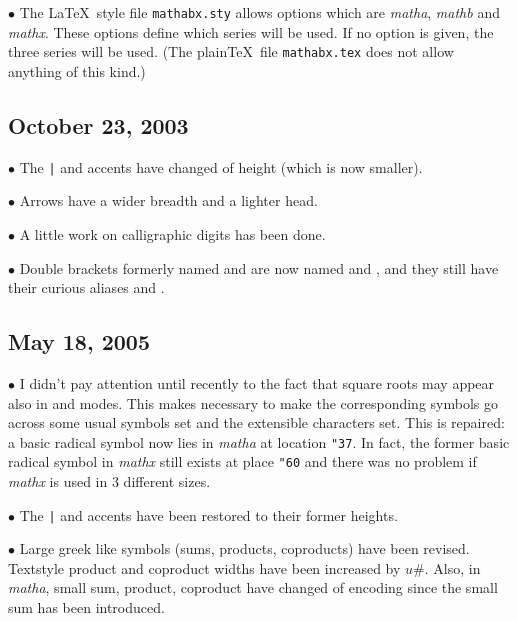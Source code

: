\item{$\bullet$}
The \LaTeX\ style file {\tt mathabx.sty} allows options
which are {\it matha}, {\it mathb}\/ and {\it mathx}.
These options define which series will be used.
If no option is given, the three series will be used.
(The plain\TeX\ file {\tt mathabx.tex} does not allow
anything of this kind.) 

\subsection*{October 23, 2003}

\item{$\bullet$} The {\tt\string\bar} and {\tt\string\widebar}
accents have changed of height (which is now smaller).

\item{$\bullet$} Arrows have a wider breadth and a lighter
head.

\item{$\bullet$} A little work on calligraphic digits has been done.

\item{$\bullet$} Double brackets formerly named
{\tt\string\lbbbrack} and {\tt\string\rbbbrack} are now
named {\tt\string\ldbrack} and {\tt\string\rdbrack}, and
they still have their curious aliases {\tt\string\lsemantic}
and {\tt\string\rsemantic}.

\subsection*{May 18, 2005}

\item{$\bullet$} I didn't pay attention until recently to
the fact that square roots may appear also in
{\tt\string\scriptstyle} and {\tt\string\scriptscriptstyle}
modes. This makes necessary to make the corresponding symbols
go across some usual symbols set and the extensible characters set.
This is repaired: a basic radical symbol now lies in {\it matha}\/
at location {\tt"37}.
In fact, the former basic radical symbol in {\it mathx}\/ still exists
at place {\tt"60} and there was no problem if {\it mathx}\/ is used
in 3 different sizes.

\item{$\bullet$} The {\tt\string\bar} and {\tt\string\widebar}
accents have been restored to their former heights.

\item{$\bullet$} Large greek like symbols (sums, products, coproducts)
have been revised. Text\-style product and coproduct widths have been
increased by $u\#$. Also, in {\it matha}, small sum, product, coproduct
have changed of encoding since the small sum has been introduced.

